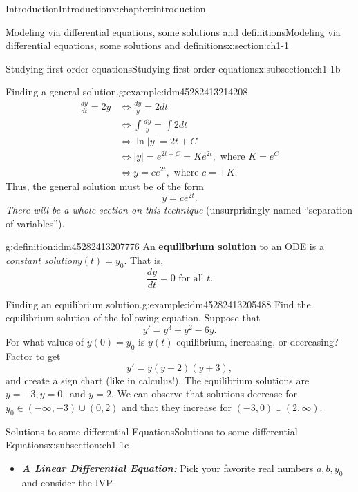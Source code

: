 \documentclass[oneside,10pt,]{book}
\newcommand{\alert}[1]{\textbf{\textit{#1}}}
\newcommand{\terminology}[1]{\textbf{#1}}
\numberwithin{equation}{section}
\numberwithin{equation}{section}
\newcommand{\amp}{&}
\begin{document}
\begin{chapterptx}{Introduction}{}{Introduction}{}{}{x:chapter:introduction}
\begin{sectionptx}{Modeling via differential equations, some solutions and definitions}{}{Modeling via differential equations, some solutions and definitions}{}{}{x:section:ch1-1}
\begin{subsectionptx}{Studying first order equations}{}{Studying first order equations}{}{}{x:subsection:ch1-1b}
\begin{example}{Finding a general solution.}{g:example:idm45282413214208}
\begin{align*}
\frac{dy}{dt}=2y \amp \iff\frac{dy}{y}=2dt\\
\amp \iff\int\frac{dy}{y}=\int2dt\\
\amp \iff\ln\left|y\right|=2t+C\\
\amp \iff\left|y\right|=e^{2t+C}=Ke^{2t},\text{ where }K=e^{C}\\
\amp \iff y=ce^{2t},\text{ where }c=\pm K.
\end{align*}
Thus, the general solution must be of the form%
\begin{equation*}
y = ce^{2t}.
\end{equation*}
\emph{There will be a whole section on this technique} (unsurprisingly named ``separation of variables'').\end{example}
\begin{definition}{}{g:definition:idm45282413207776}%
An \terminology{equilibrium solution} to an ODE is a \emph{constant solution}\(y(t) = y_0\). That is,%
\begin{equation*}
\frac{dy}{dt} = 0 \text{ for all } t.
\end{equation*}
\end{definition}
\begin{example}{Finding an equilibrium solution.}{g:example:idm45282413205488}%
 Find the equilibrium solution of the following equation. Suppose that%
\begin{equation*}
y' = y^3 + y^2 - 6y.
\end{equation*}
For what values of \(y(0) = y_0\) is \(y(t)\) equilibrium, increasing, or decreasing? Factor to get%
\begin{equation*}
y' = y(y-2)(y+3),
\end{equation*}
and create a sign chart (like in calculus!). The equilibrium solutions are \(y = -3, y=0,\) and \(y=2\). We can observe that solutions decrease for \(y_0 \in (-\infty, -3)\cup(0,2)\) and that they increase for \((-3,0)\cup(2,\infty)\).\end{example}
\end{subsectionptx}
%
%
\typeout{************************************************}
\typeout{************************************************}
%
\begin{subsectionptx}{Solutions to some differential Equations}{}{Solutions to some differential Equations}{}{}{x:subsection:ch1-1c}
%
\begin{itemize}[label=\textbullet]
\item{}\alert{A Linear Differential Equation:} Pick your favorite real numbers \(a,b,y_{0}\) and consider the IVP%

\end{itemize}
\end{subsectionptx}
\end{sectionptx}
\end{chapterptx}
\end{document}

